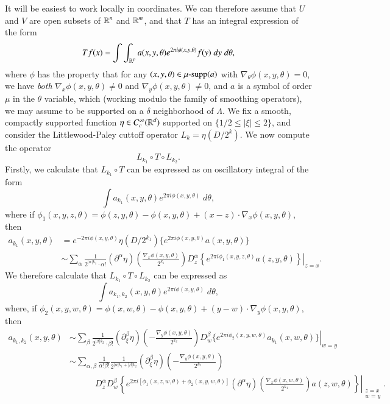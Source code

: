 It will be easiest to work locally in coordinates. We can therefore assume that $U$ and $V$ are open subsets of $\operatorname{\mathbb{R}}^n$ and $\operatorname{\mathbb{R}}^m$, and that $T$ has an integral expression of the form
%
\[ Tf(x) = \int \int_{\operatorname{\mathbb{R}}^p} a(x,y,\theta) e^{2 \pi i \phi(x,y,\theta)} f(y)\; dy\; d\theta, \]
%
where $\phi$ has the property that for any $(x,y,\theta) \in \operatorname{\text{$\mu$-supp}}(a)$ with $\nabla_\theta \phi(x,y,\theta) = 0$, we have \emph{both} $\nabla_x \phi(x,y,\theta) \neq 0$ and $\nabla_y \phi(x,y,\theta) \neq 0$, and $a$ is a symbol of order $\mu$ in the $\theta$ variable, which (working modulo the family of smoothing operators), we may assume to be supported on a $\delta$ neighborhood of $\Lambda$. We fix a smooth, compactly supported function $\eta \in C_c^\infty(\operatorname{\mathbb{R}}^d)$ supported on $\{ 1/2 \leq |\xi| \leq 2 \}$, and consider the Littlewood-Paley cuttoff operator $L_k = \eta(D / 2^k)$. We now compute the operator
%
\[ L_{k_1} \circ T \circ L_{k_2}. \]
%
Firstly, we calculate that $L_{k_1} \circ T$ can be expressed as on oscillatory integral of the form
%
\[ \int a_{k_1}(x,y,\theta) e^{2 \pi i \phi(x,y,\theta)}\; d\theta, \]
%
where if $\phi_1(x,y,z,\theta) = \phi(z,y,\theta) - \phi(x,y,\theta) + (x - z) \cdot \nabla_x \phi(x,y,\theta)$, then
%
\begin{align*}
    a_{k_1}(x,y,\theta) &= e^{- 2 \pi i \phi(x,y,\theta)} \eta ( D / 2^{k_1} ) \{ e^{2 \pi i \phi(x,y,\theta)} a(x,y,\theta) \}\\
    &\sim \sum_\alpha \frac{1}{2^{|\alpha| k_1} \cdot \alpha!} (\partial^\alpha \eta) \left( \frac{\nabla_x \phi(x,y,\theta)}{2^{k_1}} \right) \left. D^\alpha_z \left\{ e^{2 \pi i \phi_1(x,y,z,\theta)} a(z,y,\theta) \right\} \right|_{z = x}.
\end{align*}
%
We therefore calculate that $L_{k_1} \circ T \circ L_{k_2}$ can be expressed as
%
\[ \int a_{k_1,k_2}(x,y,\theta) e^{2 \pi i \phi(x,y,\theta)}\; d\theta, \]
%
where, if $\phi_2(x,y,w,\theta) = \phi(x,w,\theta) - \phi(x,y,\theta) + (y - w) \cdot \nabla_y \phi(x,y,\theta)$, then
%
\begin{align*}
    a_{k_1,k_2}(x,y,\theta) &\sim \sum_\beta \frac{1}{2^{|\beta| k_2} \cdot \beta!} (\partial_\xi^\beta \eta) \left( - \frac{\nabla_y \phi(x,y,\theta)}{2^{k_2}} \right) \left. D^\beta_w \{ e^{2 \pi i \phi_2(x,y,w,\theta)} a_{k_1}(x,w,\theta) \} \right|_{w = y}\\
    &\sim \sum_{\alpha,\beta} \frac{1}{\alpha! \beta!} \frac{1}{2^{|\alpha| k_1 + |\beta| k_2}} (\partial_\xi^\beta \eta) \left( - \frac{\nabla_y \phi(x,y,\theta)}{2^{k_2}} \right)\\
    &\quad\quad\quad \left. D^\alpha_{z} D^\beta_w \left\{ e^{2 \pi i [ \phi_1(x,z,w,\theta) + \phi_2(x,y,w,\theta) ]} (\partial^\alpha \eta) \left( \frac{\nabla_x \phi(x,w,\theta)}{2^{k_1}} \right) a(z,w,\theta) \right\} \right|_{\substack{z = x \\ w = y}}.
\end{align*}
